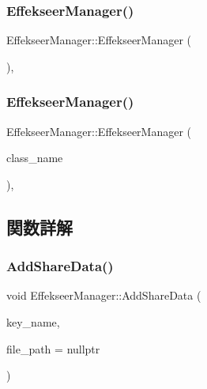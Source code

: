 \subsubsection{\texorpdfstring{Effekseer\+Manager()}{EffekseerManager()}\hspace{0.1cm}{\footnotesize\ttfamily [1/2]}}
{\footnotesize\ttfamily Effekseer\+Manager\+::\+Effekseer\+Manager (\begin{DoxyParamCaption}{ }\end{DoxyParamCaption})\hspace{0.3cm}{\ttfamily [private]}, {\ttfamily [delete]}}

\mbox{\label{class_effekseer_manager_ab6e170775c5ba410dc03b59eda589688}} 
\subsubsection{\texorpdfstring{Effekseer\+Manager()}{EffekseerManager()}\hspace{0.1cm}{\footnotesize\ttfamily [2/2]}}
{\footnotesize\ttfamily Effekseer\+Manager\+::\+Effekseer\+Manager (\begin{DoxyParamCaption}\item[{const \mbox{\hyperlink{class_effekseer_manager}{Effekseer\+Manager}} \&}]{class\+\_\+name }\end{DoxyParamCaption})\hspace{0.3cm}{\ttfamily [private]}, {\ttfamily [delete]}}



\subsection{関数詳解}
\mbox{\label{class_effekseer_manager_aec98cb9052d849cae3f9cfee80c4c873}} 
\subsubsection{\texorpdfstring{Add\+Share\+Data()}{AddShareData()}}
{\footnotesize\ttfamily void Effekseer\+Manager\+::\+Add\+Share\+Data (\begin{DoxyParamCaption}\item[{const std\+::string $\ast$}]{key\+\_\+name,  }\item[{const std\+::string $\ast$}]{file\+\_\+path = {\ttfamily nullptr} }\end{DoxyParamCaption})\hspace{0.3cm}{\ttfamily [static]}}



